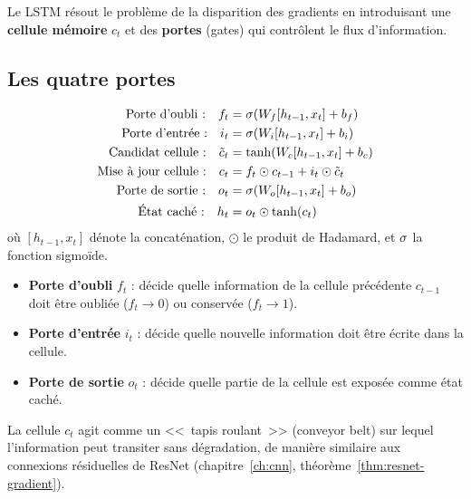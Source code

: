 Le LSTM \cite{hochreiter1997long} r\'esout le probl\`eme de la disparition
des gradients en introduisant une \textbf{cellule m\'emoire} $c_t$ et des
\textbf{portes} (gates) qui contr\^olent le flux d'information.

\subsection{Les quatre portes}

\begin{formules}[title=\textbf{\'Equations du LSTM}]
\begin{align}
\text{Porte d'oubli :} \quad
f_t &= \sigma(W_f [h_{t-1}, x_t] + b_f)
\label{eq:lstm-forget} \\
\text{Porte d'entr\'ee :} \quad
i_t &= \sigma(W_i [h_{t-1}, x_t] + b_i)
\label{eq:lstm-input} \\
\text{Candidat cellule :} \quad
\tilde{c}_t &= \tanh(W_c [h_{t-1}, x_t] + b_c)
\label{eq:lstm-candidate} \\
\text{Mise \`a jour cellule :} \quad
c_t &= f_t \odot c_{t-1} + i_t \odot \tilde{c}_t
\label{eq:lstm-cell} \\
\text{Porte de sortie :} \quad
o_t &= \sigma(W_o [h_{t-1}, x_t] + b_o)
\label{eq:lstm-output-gate} \\
\text{\'Etat cach\'e :} \quad
h_t &= o_t \odot \tanh(c_t)
\label{eq:lstm-hidden}
\end{align}
o\`u $[h_{t-1}, x_t]$ d\'enote la concat\'enation, $\odot$ le produit de
Hadamard, et $\sigma$ la fonction sigmo\"ide.
\end{formules}

\begin{intuition}[title=\textbf{R\^ole des portes}]
\begin{itemize}
  \item \textbf{Porte d'oubli} $f_t$ : d\'ecide quelle information de la
    cellule pr\'ec\'edente $c_{t-1}$ doit \^etre oubli\'ee ($f_t \to 0$) ou
    conserv\'ee ($f_t \to 1$).
  \item \textbf{Porte d'entr\'ee} $i_t$ : d\'ecide quelle nouvelle information
    doit \^etre \'ecrite dans la cellule.
  \item \textbf{Porte de sortie} $o_t$ : d\'ecide quelle partie de la cellule
    est expos\'ee comme \'etat cach\'e.
\end{itemize}
La cellule $c_t$ agit comme un <<~tapis roulant~>> (conveyor belt) sur lequel
l'information peut transiter sans d\'egradation, de mani\`ere similaire aux
connexions r\'esiduelles de ResNet (chapitre~\ref{ch:cnn},
th\'eor\`eme~\ref{thm:resnet-gradient}).
\end{intuition}

